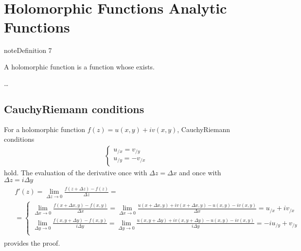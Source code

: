 \documentclass[letterpaper,10pt,english]{jupyterBook}
\begin{document}
\section{Holomorphic Functions \sphinxhyphen{} Analytic Functions}
\label{\detokenize{ch/complex/analysis:holomorphic-functions-analytic-functions}}\label{\detokenize{ch/complex/analysis:complex-analysis-holo-fun}}\label{ch/complex/analysis:definition-0}
\begin{sphinxadmonition}{note}{Definition 7}



\sphinxAtStartPar
A holomorphic function is a function whose {\hyperref[\detokenize{ch/complex/analysis:complex-analysis-fun-derivative}]{}} exists.
\end{sphinxadmonition}

\sphinxAtStartPar
{} …


\subsection{Cauchy\sphinxhyphen{}Riemann conditions}
\label{\detokenize{ch/complex/analysis:cauchy-riemann-conditions}}\label{\detokenize{ch/complex/analysis:complex-analysis-holo-fun-cauchy-riemann}}
\sphinxAtStartPar
For a holomorphic function \(f(z) = u(x,y) + i v(x,y)\), Cauchy\sphinxhyphen{}Riemann conditions
\begin{equation*}
\begin{split}\begin{cases}
u_{/x} = v_{/y} \\
u_{/y} = - v_{/x}
\end{cases}\end{split}
\end{equation*}
\sphinxAtStartPar
hold. The evaluation of the derivative once with \(\Delta z = \Delta x\) and once with \(\Delta z = i \Delta y\)
\begin{equation*}
\begin{split}\begin{aligned}
& f'(z) = \lim_{\Delta z \rightarrow 0} \frac{f(z+\Delta z) - f(z)}{\Delta z} = \\ 
& = \left\{
\begin{aligned}
  \lim_{\Delta x \rightarrow 0} \frac{f(x+\Delta x,y) - f(x,y)}{\Delta x} = \lim_{\Delta x \rightarrow 0} \frac{u(x+\Delta x,y) + i v(x+\Delta x,y) - u(x,y) - i v(x,y)}{\Delta x} = u_{/x} + i v_{/x} \\ 
  \lim_{\Delta y \rightarrow 0} \frac{f(x,y+\Delta y) - f(x,y)}{i \Delta y} = \lim_{\Delta y \rightarrow 0}  \frac{u(x,y+\Delta y) + i v(x,y+\Delta y) - u(x,y) - i v(x,y)}{i \Delta y} = -i u_{/y} + v_{/y} \\ 
\end{aligned}
\right.
\end{aligned}\end{split}
\end{equation*}
\sphinxAtStartPar
provides the proof.
\end{document}

